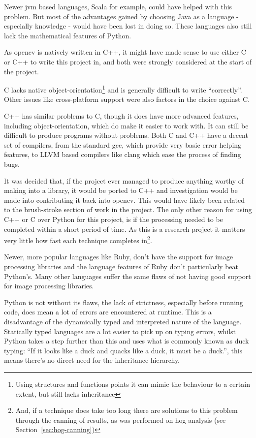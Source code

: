 Newer \gls{jvm} based languages, Scala for example, could have helped with this problem. But most
of the advantages gained by choosing Java as a language - especially knowledge - would have been
lost in doing so. These languages also still lack the mathematical features of Python.

As \gls{opencv} is natively written in C++, it might have made sense to use either C or C++ to write 
this project in, and both were strongly considered at the start of the project.

C lacks native object-orientation\footnote{Using structures and functions points it can mimic the 
behaviour to a certain extent, but still lacks inheritance} and is generally difficult to write 
``correctly''. Other issues like cross-platform support were also factors in the choice against C.

C++ has similar problems to C, though it does have more advanced features, including 
object-orientation, which do make it easier to work with. It can still be difficult to produce 
programs without problems. Both C and C++ have a decent set of compilers, from the standard 
\gls{gcc}, which provide very basic error helping features, to LLVM based compilers like clang which 
ease the process of finding bugs.

It was decided that, if the project ever managed to produce anything worthy of making into a
library, it would be ported to C++ and investigation would be made into contributing it back into
\gls{opencv}. This would have likely been related to the brush-stroke section of work in the project. 
The only other reason for using C++ or C over Python for this project, is if the processing needed
to be completed within a short period of time. As this is a research project it matters very 
little how fast each technique completes in\footnote{And, if a technique does take too long there 
are solutions to this problem through the canning of results, as was performed on \gls{hog} 
analysis (see Section~\ref{sec:hog-canning})}.

Newer, more popular languages like Ruby, don't have the support for image processing libraries and
the language features of Ruby don't particularly beat Python's. Many other languages suffer the
same flaws of not having good support for image processing libraries.

Python is not without its flaws, the lack of strictness, especially before running code, does mean
a lot of errors are encountered at runtime. This is a disadvantage of the dynamically typed and
interpreted nature of the language. Statically typed languages are a lot easier to pick up on
typing errors, whilst Python takes a step further than this and uses what is commonly known as duck
typing: ``If it looks like a duck and quacks like a duck, it must be a duck.''\cite{2013Glossary},
this means there's no direct need for the inheritance hierarchy. 


